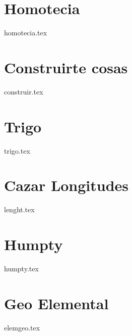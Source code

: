 \chapter{Homotecia}
{homotecia.tex}

\chapter{Construirte cosas}
{construir.tex}

\chapter{Trigo}
{trigo.tex}

\chapter{Cazar Longitudes}
{lenght.tex}

\chapter{Humpty}
{humpty.tex}

\chapter{Geo Elemental \gad}
{elemgeo.tex}



